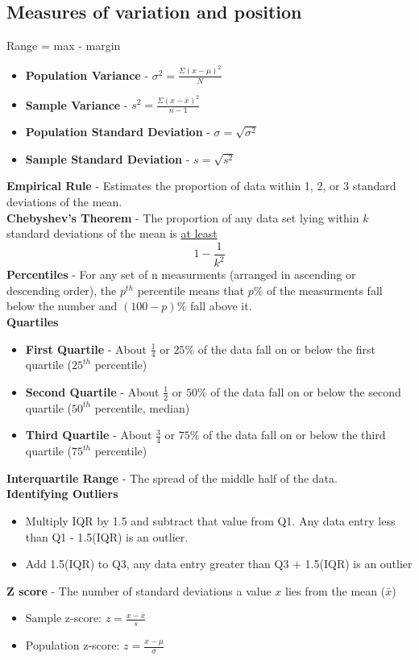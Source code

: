 \documentclass[a4paper]{article}
\let\bf\textbf
\begin{document}
\subsection{Measures of variation and position}
Range = max - margin
\begin{itemize}
    \item \bf{Population Variance} - $\displaystyle\sigma^2 = \frac{\Sigma (x - \mu)^2}{N}$
    \item \bf{Sample Variance} - $\displaystyle s^2 = \frac{\Sigma (x - \bar{x})^2}{n - 1}$
    \item \bf{Population Standard Deviation} - $\displaystyle\sigma = \sqrt{\sigma^2}$
    \item \bf{Sample Standard Deviation} - $\displaystyle s = \sqrt{s^2}$
\end{itemize}
\bf{Empirical Rule} - Estimates the proportion of data within 1, 2, or 3 standard deviations of the mean.\\
\bf{Chebyshev's Theorem} - The proportion of any data set lying within $k$ standard deviations of the mean is \underline{at least} 
\begin{equation}
    1 - \frac{1}{k^2}
\end{equation}
\bf{Percentiles} - For any set of n measurments (arranged in ascending or descending order), the $p^{th}$ percentile means that $p\%$ of the measurments fall below the number and $(100 - p)\%$ fall above it.
\vspace{2mm}\\
\bf{Quartiles}
\begin{itemize}
    \item \bf{First Quartile} - About $\frac{1}{4}$ or $25\%$ of the data fall on or below the first quartile ($25^{th}$ percentile)
    \item \bf{Second Quartile} - About $\frac{1}{2}$ or $50\%$ of the data fall on or below the second quartile ($50^{th}$ percentile, median)
    \item \bf{Third Quartile} - About $\frac{3}{4}$ or $75\%$ of the data fall on or below the third quartile ($75^{th}$ percentile)
\end{itemize}
\bf{Interquartile Range} - The spread of the middle half of the data.
\vspace{2mm}\\
\bf{Identifying Outliers} 
\begin{itemize}
    \item Multiply IQR by 1.5 and subtract that value from Q1. Any data entry less than Q1 - 1.5(IQR) is an outlier. 
    \item Add 1.5(IQR) to Q3, any data entry greater than Q3 + 1.5(IQR) is an outlier
\end{itemize}
\bf{Z score} - The number of standard deviations a value $x$ lies from the mean ($\bar{x}$)
\begin{itemize}
    \item Sample z-score: $\displaystyle z = \frac{x - \bar{x}}{s}$
    \item Population z-score: $\displaystyle z = \frac{x - \mu}{\sigma}$
\end{itemize}
\end{document}
